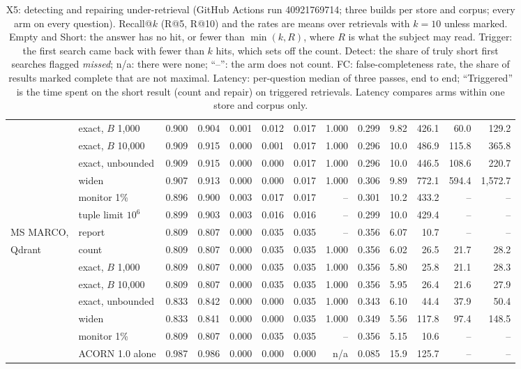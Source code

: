 \begin{table}[tbp]
\begin{tabular}{@{}llrrrrrrrrrrr@{}}
 & exact, $B$ 1,000 & 0.900 & 0.904 & 0.001 & 0.012 & 0.017 & 1.000 & 0.299 & 9.82 & 426.1 & 60.0 & 129.2 \\
 & exact, $B$ 10,000 & 0.909 & 0.915 & 0.000 & 0.001 & 0.017 & 1.000 & 0.296 & 10.0 & 486.9 & 115.8 & 365.8 \\
 & exact, unbounded & 0.909 & 0.915 & 0.000 & 0.000 & 0.017 & 1.000 & 0.296 & 10.0 & 446.5 & 108.6 & 220.7 \\
 & widen & 0.907 & 0.913 & 0.000 & 0.000 & 0.017 & 1.000 & 0.306 & 9.89 & 772.1 & 594.4 & 1,572.7 \\
 & monitor 1\% & 0.896 & 0.900 & 0.003 & 0.017 & 0.017 & -- & 0.301 & 10.2 & 433.2 & -- & -- \\
 & tuple limit $10^6$ & 0.899 & 0.903 & 0.003 & 0.016 & 0.016 & -- & 0.299 & 10.0 & 429.4 & -- & -- \\
\midrule
MS MARCO, & report & 0.809 & 0.807 & 0.000 & 0.035 & 0.035 & -- & 0.356 & 6.07 & 10.7 & -- & -- \\
Qdrant & count & 0.809 & 0.807 & 0.000 & 0.035 & 0.035 & 1.000 & 0.356 & 6.02 & 26.5 & 21.7 & 28.2 \\
 & exact, $B$ 1,000 & 0.809 & 0.807 & 0.000 & 0.035 & 0.035 & 1.000 & 0.356 & 5.80 & 25.8 & 21.1 & 28.3 \\
 & exact, $B$ 10,000 & 0.809 & 0.807 & 0.000 & 0.035 & 0.035 & 1.000 & 0.356 & 5.95 & 26.4 & 21.6 & 27.9 \\
 & exact, unbounded & 0.833 & 0.842 & 0.000 & 0.000 & 0.035 & 1.000 & 0.343 & 6.10 & 44.4 & 37.9 & 50.4 \\
 & widen & 0.833 & 0.841 & 0.000 & 0.000 & 0.035 & 1.000 & 0.349 & 5.56 & 117.8 & 97.4 & 148.5 \\
 & monitor 1\% & 0.809 & 0.807 & 0.000 & 0.035 & 0.035 & -- & 0.356 & 5.15 & 10.6 & -- & -- \\
 & ACORN 1.0 alone & 0.987 & 0.986 & 0.000 & 0.000 & 0.000 & n/a & 0.085 & 15.9 & 125.7 & -- & -- \\
\bottomrule
\end{tabular}
\caption{X5: detecting and repairing under-retrieval (GitHub Actions run 40921769714; three builds per
store and corpus; every arm on every question). Recall@$k$ (R@5, R@10) and the rates are means over
retrievals with $k = 10$ unless marked. Empty and Short: the answer has no hit, or fewer than
$\min(k, R)$, where $R$ is what the subject may read. Trigger: the first search came back with fewer
than $k$ hits, which sets off the count. Detect: the share of truly short first searches flagged
\emph{missed}; n/a: there were none; ``--'': the arm does not count. FC: false-completeness rate, the
share of results marked complete that are not maximal. Latency: per-question median of three passes,
end to end; ``Triggered'' is the time spent on the short result (count and repair) on triggered
retrievals. Latency compares arms within one store and corpus only.}
\label{tab:rep-results}
\end{table}

